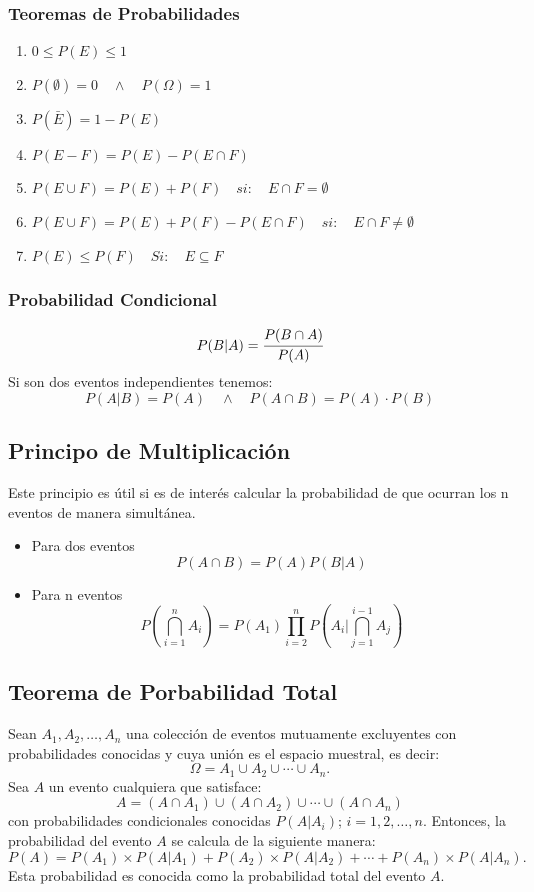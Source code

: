 \documentclass{article}
\begin{document}
        \subsubsection*{Teoremas de Probabilidades}
        \begin{enumerate}
            \item $0\leq P(E) \leq 1$
            \item $P(\emptyset) = 0 \quad\land\quad P(\Omega)=1$
            \item $P(\bar{E})=1-P(E)$
            \item $P(E-F)= P(E)-P(E\cap F)$
            \item $P(E\cup F) = P(E)+P(F)\quad si:\quad E\cap F = \emptyset$
            \item $P(E\cup F) = P(E)+P(F) - P(E\cap F)\quad si:\quad E\cap F \neq \emptyset$
            \item $P(E)\leq P(F)\quad Si:\quad E\subseteq F$
        \end{enumerate}
        \subsubsection*{Probabilidad Condicional}
            \[P(B|A) =\cfrac{P(B\cap A)}{P(A)}\]
            Si son dos eventos independientes tenemos:
            \[P(A|B) = P(A)\quad\land\quad P(A\cap B) = P(A)\cdot P(B)\]
    
    \subsection{Principo de Multiplicación}
        Este principio es útil si es de interés calcular la probabilidad de que ocurran los n eventos de manera simultánea.
        \begin{itemize}
            \item Para dos eventos  \[P(A\cap B)= P(A)P(B|A)\]
            \item Para n eventos \[P(\bigcap_{i=1}^{n}A_i) = P(A_1)\prod_{i=2}^{n}P(A_i| \bigcap_{j=1}^{i-1}A_j)\]
        \end{itemize}
    
    \subsection{Teorema de Porbabilidad Total}
        Sean \( A_1, A_2, \ldots, A_n \) una colección de eventos mutuamente excluyentes con probabilidades conocidas y cuya unión es el espacio muestral, es decir:
        \[\Omega = A_1 \cup A_2 \cup \cdots \cup A_n.\]
        Sea \( A \) un evento cualquiera que satisface:
        \[A = (A \cap A_1) \cup (A \cap A_2) \cup \cdots \cup (A \cap A_n)\]
        con probabilidades condicionales conocidas \( P(A | A_i) \); \( i = 1, 2, \ldots, n \). Entonces, la probabilidad del evento \( A \) se calcula de la siguiente manera:
        \[P(A) = P(A_1) \times P(A | A_1) + P(A_2) \times P(A | A_2) + \cdots + P(A_n) \times P(A | A_n).\]
        Esta probabilidad es conocida como la probabilidad total del evento \( A \).
\end{document}
